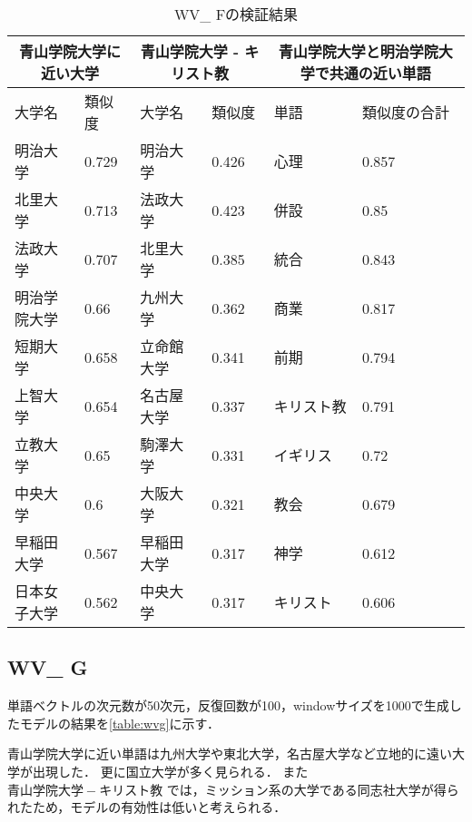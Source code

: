 \begin{table}[H]
\caption{WV\_ Fの検証結果}
\centering
\footnotesize
\begin{tabular}{ll|ll|ll}
\hline
\multicolumn{2}{c}{青山学院大学に近い大学} & \multicolumn{2}{c}{青山学院大学 - キリスト教} & \multicolumn{2}{c}{青山学院大学と明治学院大学で共通の近い単語}
\\ \hline
大学名 & 類似度 & 大学名 & 類似度 & 単語 & 類似度の合計
\\ \hline \hline
明治大学 & 0.729 & 明治大学 & 0.426 & 心理 & 0.857\\
北里大学 & 0.713 & 法政大学 & 0.423 & 併設 & 0.85\\
法政大学 & 0.707 & 北里大学 & 0.385 & 統合 & 0.843\\
明治学院大学 & 0.66 & 九州大学 & 0.362 & 商業 & 0.817\\
短期大学 & 0.658 & 立命館大学 & 0.341 & 前期 & 0.794\\
上智大学 & 0.654 & 名古屋大学 & 0.337 & キリスト教 & 0.791\\
立教大学 & 0.65 & 駒澤大学 & 0.331 & イギリス & 0.72\\
中央大学 & 0.6 & 大阪大学 & 0.321 & 教会 & 0.679\\
早稲田大学 & 0.567 & 早稲田大学 & 0.317 & 神学 & 0.612\\
日本女子大学 & 0.562 & 中央大学 & 0.317 & キリスト & 0.606\\ \hline
\end{tabular}
\label{table:wvf}
\end{table}


\subsection{WV\_ G}
単語ベクトルの次元数が50次元，反復回数が100，windowサイズを1000で生成したモデルの結果を\ref{table:wvg}に示す．

青山学院大学に近い単語は九州大学や東北大学，名古屋大学など立地的に遠い大学が出現した．
更に国立大学が多く見られる．
また $ 青山学院大学 - キリスト教 $ では，ミッション系の大学である同志社大学が得られたため，モデルの有効性は低いと考えられる．

